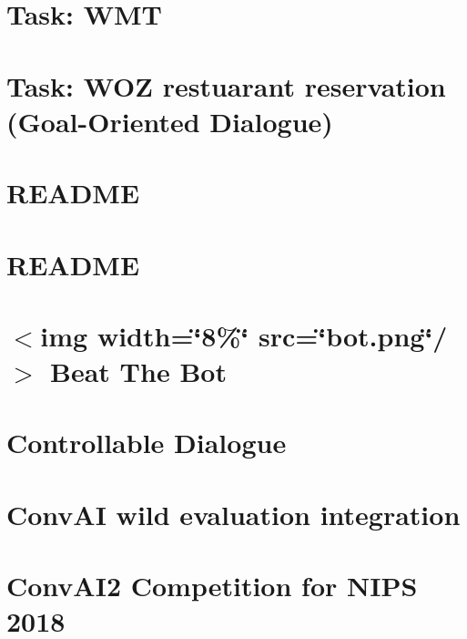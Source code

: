 \documentclass[twoside]{book}
\newcommand{\+}{\discretionary{\mbox{\scriptsize$\hookleftarrow$}}{}{}}
\begin{document}
\chapter{Task\+: W\+MT}
\label{md_parlai_tasks_wmt_README}

\chapter{Task\+: W\+OZ restuarant reservation (Goal-\/\+Oriented Dialogue)}
\label{md_parlai_tasks_woz_README}

\chapter{R\+E\+A\+D\+ME}
\label{md_parlai_zoo_pretrained_transformers_README}

\chapter{R\+E\+A\+D\+ME}
\label{md_parlai_zoo_README}

\chapter{$<$img width=\char`\"{}8\%\char`\"{} src=\char`\"{}bot.\+png\char`\"{}/$>$ Beat The Bot}
\label{md_projects_beat_the_bot_README}

\chapter{Controllable Dialogue}
\label{md_projects_controllable_dialogue_README}

\chapter{Conv\+AI \textquotesingle{}wild\textquotesingle{} evaluation integration}
\label{md_projects_convai_README}

\chapter{Conv\+A\+I2 Competition for N\+I\+PS 2018}
\label{md_projects_convai2_README}

\end{document}
